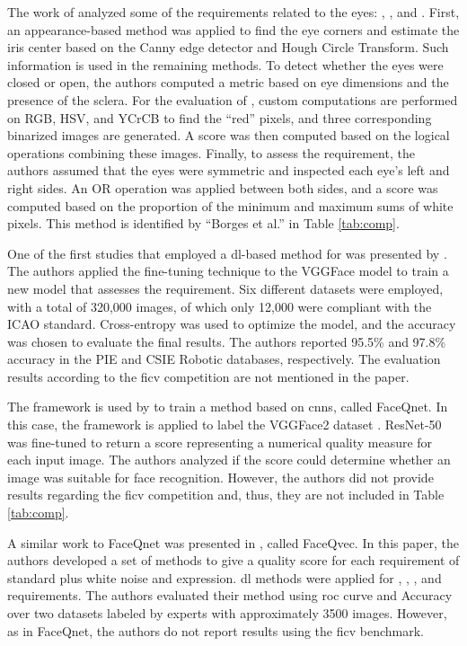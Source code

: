 The work of \citet{borges2016analysis} analyzed some of the requirements related to the eyes: \eyesclosed, \redeyes, and \lookingaway. First, an appearance-based method was applied to find the eye corners and estimate the iris center based on the Canny edge detector and Hough Circle Transform. Such information is used in the remaining methods. To detect whether the eyes were closed or open, the authors computed a metric based on eye dimensions and the presence of the sclera. For the evaluation of \redeyes, custom computations are performed on RGB, HSV, and YCrCB to find the ``red'' pixels, and three corresponding binarized images are generated. A score was then computed based on the logical operations combining these images. Finally, to assess the \lookingaway requirement, the authors assumed that the eyes were symmetric and inspected each eye's left and right sides. An OR operation was applied between both sides, and a score was computed based on the proportion of the minimum and maximum sums of white pixels. This method is identified by ``Borges et al.'' in Table \ref{tab:comp}.
 
One of the first studies that employed a \acl{dl}-based method for \icao was presented by \cite{ahmadvand2018estimating}. The authors applied the fine-tuning technique to the VGGFace model \citep{simonyan2014very} to train a new model that assesses the \rollpitchyaw requirement. Six different datasets were employed, with a total of 320,000 images, of which only 12,000 were compliant with the ICAO standard. Cross-entropy was used to optimize the model, and the accuracy was chosen to evaluate the final results. The authors reported 95.5\% and 97.8\% accuracy in the PIE \citep{sim2002cmu} and CSIE Robotic \citep{csie2006database} databases, respectively. The evaluation results according to the \acs{ficv} competition are not mentioned in the paper.
 
The \biolabicao framework is used by \cite{hernandez2019faceqnet} to train a method based on \aclp{cnn}, called FaceQnet. In this case, the framework is applied to label the VGGFace2 dataset \citep{cao2018vggface2}. ResNet-50 \citep{he2016deep} was fine-tuned to return a score representing a numerical quality measure for each input image. The authors analyzed if the score could determine whether an image was suitable for face recognition. However, the authors did not provide results regarding the \acs{ficv} competition and, thus, they are not included in Table \ref{tab:comp}.

A similar work to FaceQnet was presented in \citep{hernandez2022faceqvec}, called FaceQvec. In this paper, the authors developed a set of methods to give a quality score for each requirement of \icao standard plus white noise and expression. \acl{dl} methods were applied for \mouthopen, \eyesclosed, \hairacrosseyes, and \rollpitchyaw requirements. The authors evaluated their method using \acf{roc} curve and Accuracy over two \adhoc datasets labeled by experts with approximately 3500 images. However, as in FaceQnet, the authors do not report results using the \acs{ficv} benchmark.
 
